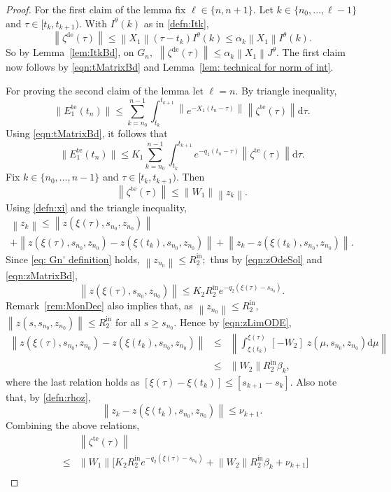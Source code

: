 \documentclass[usenames,dvipsnames,final,12pt]{colt2018} %
\newcommand{\Xt}{X_1}
\newcommand{\Wt}{W_1}
\newcommand{\lt}{q_1}
\newcommand{\Et}{E_1}
\newcommand{\Kt}{K_1}
\newcommand{\zetD}{\zeta^{\dt}}
\newcommand{\zetT}{\zeta^{\te}}
\newcommand{\EtT}{\Et^{\te}}
\newcommand{\Ww}{W_2}
\newcommand{\lz}{q_2}
\newcommand{\Rzi}{R_2^{\textrm{in}}}
\newcommand{\rz}{\nu}
\newcommand{\Kz}{K_2}
\newcommand{\zSol}[1]{z(#1, \sI{n_0}, z_{n_0})}
\newcommand{\dt}{\text{de}}
\newcommand{\te}{\text{te}}
\newcommand{\df}{\mathrm{d}}
\newcommand{\tI}[1]{t_{#1}}
\newcommand{\sI}[1]{s_{#1}}
\newcommand{\norm}[1]{\left\lVert#1\right\rVert}
\newcommand{\Jt}{J^\theta}
\newcommand{\It}{I^\theta}
\newcommand{\gal}[1]{#1}
\begin{document}
\begin{proof}
For the first claim of the lemma fix $\ell \in \{n, n + 1\}.$ Let $k \in \{n_0, \ldots,\ell - 1\}$ and  $\tau \in [\tI{k}, \tI{k + 1}).$ With $\It(k)$ as in \eqref{defn:Itk},
%
\[
\norm{\zetD(\tau)} \leq \norm{\Xt}  (\tau - \tI{k}) \It(k) \leq \alpha_k \norm{\Xt} \It(k).
\]
%
So by Lemma~\ref{lem:ItkBd}, on $G_n,$ $\norm{\zetD(\tau)} \leq \alpha_k \norm{\Xt} \Jt.$ The first claim now follows
by \eqref{eqn:tMatrixBd} and Lemma~\ref{lem: technical for norm of int}.

For proving the second claim of the lemma  let $\ell = n.$ By triangle inequality,
%
\[
\|\EtT(\tI{n})\| \leq \sum_{k = n_0}^{n - 1} \int_{\tI{k}}^{\tI{k + 1}} \norm{e^{-\Xt(\tI{n} - \tau)}} \norm{\zetT(\tau)} \df \tau.
\]
%
Using \eqref{eqn:tMatrixBd}, it follows that
%
\[
\|\EtT(\tI{n})\| \leq  \Kt \sum_{k = n_0}^{n - 1} \int_{\tI{k}}^{\tI{k + 1}} e^{-\lt(\tI{n} - \tau)} \norm{\zetT(\tau)} \df \tau.
\]
%
Fix $k \in \{n_0, \ldots, n - 1\}$ and $\tau \in [\tI{k}, \tI{k + 1}).$ Then
%
\[
\norm{\zetT(\tau)} \leq \norm{W_1} \norm{z_k}.
\]
%
Using \eqref{defn:xi} and the triangle inequality,
%
\begin{multline*}
\norm{z_k} \leq \norm{\zSol{\xi(\tau)}}\\  + \norm{\zSol{\xi(\tau)} - \zSol{\xi(\tI{k})}}
+  \norm{z_k - \zSol{\xi(\tI{k})}}.
\end{multline*}
%
\gal{Since \eqref{eq: Gn' definition} holds}, $\norm{z_{n_0}} \leq \Rzi;$ thus by \eqref{eqn:zOdeSol} and  \eqref{eqn:zMatrixBd},
%
\[
\norm{\zSol{\xi(\tau)}} \leq \Kz \Rzi e^{-\lz(\xi(\tau) - \sI{n_0})}.
\]
%
Remark~\ref{rem:MonDec} also implies that, as $\norm{z_{n_0}} \leq \Rzi,$ $\norm{\zSol{s}} \leq \Rzi$ for all $s \geq \sI{n_0}.$ Hence by \eqref{eqn:zLimODE},
%
\begin{eqnarray*}
\norm{\zSol{\xi(\tau)} - \zSol{\xi(\tI{k})}} & \leq & \norm{ \int_{\xi(\tI{k})}^{\xi(\tau)}[-\Ww]\; \zSol{\mu} \df \mu}\\
& \leq & \norm{\Ww}\Rzi \beta_k,
\end{eqnarray*}
%
where the last relation holds as $[\xi(\tau) - \xi(\tI{k})] \leq [\sI{k + 1} - \sI{k}].$ Also note that, by \eqref{defn:rhoz},
%
\[
\norm{z_k - \zSol{\xi(\tI{k})}} \leq \rz_{k + 1}.
\]
%
Combining the above relations,
%
\begin{eqnarray*}
& & \norm{\zetT(\tau)}\\
& \leq & \norm{\Wt}\bigg[\Kz \Rzi e^{-\lz(\xi(\tau) - \sI{n_0})} + \norm{\Ww} \Rzi \beta_k + \rz_{k + 1}\bigg]\\

\end{eqnarray*}
\end{proof}
\end{document}
